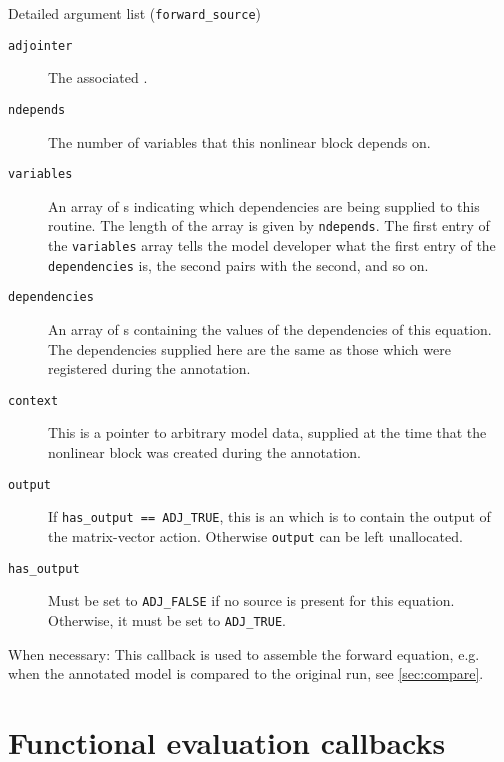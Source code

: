 \begin{boxwithtitle}{Detailed argument list (\texttt{forward_source})}
\begin{description}
\item[\texttt{adjointer}] The associated .
\item[\texttt{ndepends}] The number of variables that this nonlinear block depends on.
\item[\texttt{variables}] An array of s indicating which dependencies are being supplied to this routine. The length of the
array is given by \texttt{ndepends}. The first entry of the \texttt{variables} array
tells the model developer what the first entry of the \texttt{dependencies} is, the second pairs with the second, and so on.
\item[\texttt{dependencies}] An array of s containing the values of the dependencies of this equation. The dependencies supplied
here are the same as those which were registered during the annotation.
\item[\texttt{context}] This is a pointer to arbitrary model data, supplied at the time that the nonlinear block was created during the annotation.
\item[\texttt{output}] If \texttt{has_output == ADJ_TRUE}, this is an  which is to contain the output of the matrix-vector action. Otherwise \texttt{output} can be left unallocated.
\item[\texttt{has_output}] Must be set to \texttt{ADJ_FALSE} if no source is present for this equation. Otherwise, it must be set to \texttt{ADJ_TRUE}.
\end{description}
\end{boxwithtitle}

When necessary: 
This callback is used to assemble the forward equation, e.g. when the annotated model is compared to the original run, see \autoref{sec:compare}.

\section{Functional evaluation callbacks}

